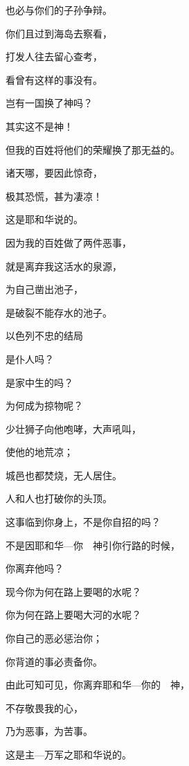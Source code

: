 {\par }{\Q 也必与你们的子孙争辩。
\par }{\Q {}你们且过到{}海岛去察看，
\par }{\Q 打发人往{}去留心查考，
\par }{\Q 看曾有这样的事没有。
\par }{\Q {}岂有一国换了{}神吗？
\par }{\Q 其实这不是神！
\par }{\Q 但我的百姓将他们的荣耀换了那无益的{}。
\par }{\Q {}诸天哪，要因此惊奇，
\par }{\Q 极其恐慌，甚为凄凉！
\par }{\Q 这是耶和华说的。
\par }{\Q {}因为我的百姓做了两件恶事，
\par }{\Q 就是离弃我这活水的泉源，
\par }{\Q 为自己凿出池子，
\par }{\Q 是破裂不能存水的池子。
\par }{\BB \par }{\SH 以色列不忠的结局
\par }{\Q {}是仆人吗？
\par }{\Q 是家中生的{}吗？
\par }{\Q 为何成为掠物呢？
\par }{\Q {}少壮狮子向他咆哮，大声吼叫，
\par }{\Q 使他的地荒凉；
\par }{\Q 城邑也都焚烧，无人居住。
\par }{\Q {}人和{}人也打破你的头顶。
\par }{\Q {}这事临到你身上，不是你自招的吗？
\par }{\Q 不是因耶和华—你　神引你行路的时候，
\par }{\Q 你离弃他吗？
\par }{\Q {}现今你为何在{}路上要喝{}的水呢？
\par }{\Q 你为何在{}路上要喝大河的水呢？
\par }{\Q {}你自己的恶必惩治你；
\par }{\Q 你背道的事必责备你。
\par }{\Q 由此可知可见，你离弃耶和华—你的　神，
\par }{\Q 不存敬畏我的心，
\par }{\Q 乃为恶事，为苦事。
\par }{\Q 这是主—万军之耶和华说的。
}
